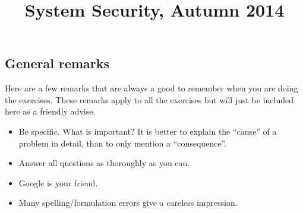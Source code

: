 \documentclass[a4paper,11pt]{article}
\title{System Security, Autumn 2014}
\newcommand{\includeonlyinsolution}[1]{\ifsolution#1\fi}
\begin{document}
\maketitle

\includeonlyinsolution{
\subsection*{General remarks}
Here are a few remarks that are always a good to remember when you are doing the
exercises. These remarks apply to all the exercises but will just be included
here as a friendly advise.
\begin{itemize}
\item Be specific. What is important? It is better to explain the ``cause'' of a
problem in detail, than to only mention a ``consequence''.
\item Answer all questions as thoroughly as you can.
\item Google is your friend.
\item Many spelling/formulation errors give a careless impression.
\end{itemize}
}
\end{document}
